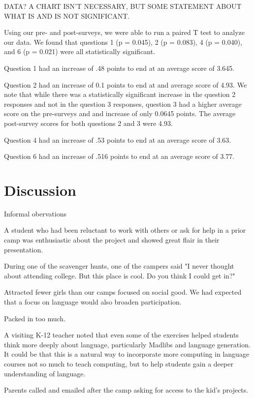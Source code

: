 DATA?  A CHART ISN'T NECESSARY, BUT SOME STATEMENT ABOUT WHAT IS AND
IS NOT SIGNIFICANT.


Using our pre- and post-surveys, we were able to run a paired T test to
analyze our data. We found that questions 1 (p = 0.045), 2 (p = 0.083), 
4 (p = 0.040), and 6 (p = 0.021) were all statistically significant. 

Question 1 had an increase of .48 points to end at an average score 
of 3.645.

Question 2 had an increase of 0.1 points to end at and average score of
4.93. We note that while there was a statistically significant increase
in the question 2 responses and not in the question 3 responses, 
question 3 had a higher average score on the pre-surveys and and 
increase of only 0.0645 points. The average post-survey scores
for both questions 2 and 3 were 4.93.

Question 4 had an increase of .53 points to end at an average score
of 3.63.

Question 6 had an increase of .516 points to end at an average score
of 3.77.

\section{Discussion}

Informal obervations

A student who had been reluctant to work with others or ask for help
in a prior camp was enthusiastic about the project and showed great
flair in their presentation.

During one of the scavenger hunts, one of the campers said "I never
thought about attending college.  But this place is cool.  Do you
think I could get in?"

Attracted fewer girls than our camps focused on social good.  We had
expected that a focus on language would also broaden participation.  

Packed in too much.

A visiting K-12 teacher noted that even some of the exercises helped
students think more deeply about language, particularly Madlibs and language
generation.  It could be that this is a natural way to incorporate more
computing in language courses not so much to teach computing, but to 
help students gain a deeper understanding of language.

Parents called and emailed after the camp asking for access to the
kid's projects.

